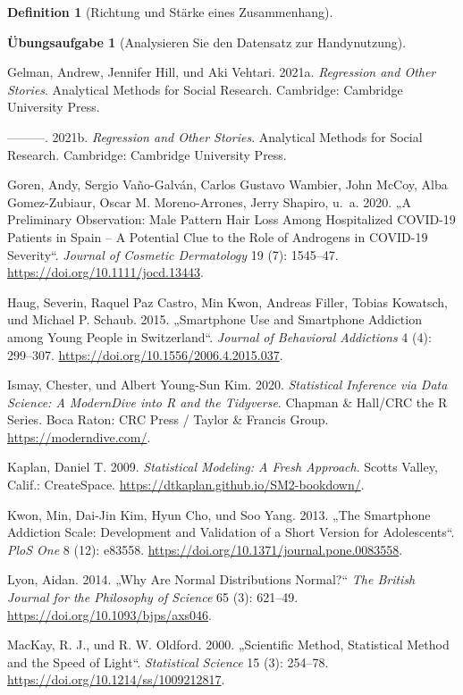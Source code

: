 \documentclass[
  a4paper,
  DIV=11]{scrreprt}
\newlength{\cslhangindent}
\newenvironment{CSLReferences}[2] %
 {\begin{list}{}{%
  \setlength{\itemindent}{0pt}
  \setlength{\leftmargin}{0pt}
  \setlength{\parsep}{0pt}
  \ifodd #1
   \setlength{\leftmargin}{\cslhangindent}
   \setlength{\itemindent}{-1\cslhangindent}
  \fi
  \setlength{\itemsep}{#2\baselineskip}}}
 {\end{list}}
\theoremstyle{definition}
\newtheorem{exercise}{Übungsaufgabe}[chapter]
\theoremstyle{definition}
\theoremstyle{definition}
\newtheorem{definition}{Definition}[chapter]
\theoremstyle{remark}
\begin{document}
\begin{definition}[Richtung und Stärke eines
Zusammenhang]
\begin{exercise}[Analysieren Sie den Datensatz zur
Handynutzung]
\begin{CSLReferences}{1}{0}
Gelman, Andrew, Jennifer Hill, und Aki Vehtari. 2021a. \emph{Regression
and Other Stories}. Analytical Methods for Social Research. Cambridge:
Cambridge University Press.

---------. 2021b. \emph{Regression and Other Stories}. Analytical
Methods for Social Research. Cambridge: Cambridge University Press.

Goren, Andy, Sergio Vaño-Galván, Carlos Gustavo Wambier, John McCoy,
Alba Gomez-Zubiaur, Oscar M. Moreno-Arrones, Jerry Shapiro, u.~a. 2020.
{„A Preliminary Observation: {Male} Pattern Hair Loss Among Hospitalized
{COVID-19} Patients in {Spain} -- {A} Potential Clue to the Role of
Androgens in {COVID-19} Severity``}. \emph{Journal of Cosmetic
Dermatology} 19 (7): 1545--47. \url{https://doi.org/10.1111/jocd.13443}.

Haug, Severin, Raquel Paz Castro, Min Kwon, Andreas Filler, Tobias
Kowatsch, und Michael P. Schaub. 2015. {„Smartphone Use and Smartphone
Addiction among Young People in {Switzerland}``}. \emph{Journal of
Behavioral Addictions} 4 (4): 299--307.
\url{https://doi.org/10.1556/2006.4.2015.037}.

Ismay, Chester, und Albert Young-Sun Kim. 2020. \emph{Statistical
Inference via Data Science: A {ModernDive} into {R} and the
{Tidyverse}}. Chapman \& {Hall}/{CRC} the {R Series}. Boca Raton: CRC
Press / Taylor \& Francis Group. \url{https://moderndive.com/}.

Kaplan, Daniel T. 2009. \emph{Statistical Modeling: A Fresh Approach}.
Scotts Valley, Calif.: CreateSpace.
\url{https://dtkaplan.github.io/SM2-bookdown/}.

Kwon, Min, Dai-Jin Kim, Hyun Cho, und Soo Yang. 2013. {„The Smartphone
Addiction Scale: Development and Validation of a Short Version for
Adolescents``}. \emph{PloS One} 8 (12): e83558.
\url{https://doi.org/10.1371/journal.pone.0083558}.

Lyon, Aidan. 2014. {„Why Are {Normal Distributions Normal}?``} \emph{The
British Journal for the Philosophy of Science} 65 (3): 621--49.
\url{https://doi.org/10.1093/bjps/axs046}.

MacKay, R. J., und R. W. Oldford. 2000. {„Scientific {Method},
{Statistical Method} and the {Speed} of {Light}``}. \emph{Statistical
Science} 15 (3): 254--78. \url{https://doi.org/10.1214/ss/1009212817}.


\end{CSLReferences}
\end{exercise}
\end{definition}
\end{document}
